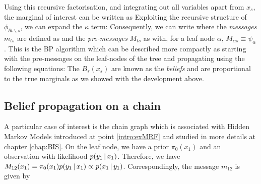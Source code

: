 Using this recursive factorisation, and integrating out all variables apart from $x_{s}$, the marginal of interest can be written as
Exploiting the recursive structure of $\phi_{\partial t\backslash s}$, we can expand the $\kappa$ term:
Consequently, we can write
where the \emph{messages} $m_{ts}$ are defined as
and the \emph{pre-messages} $M_{ts}$ as
with, for a leaf node $\alpha$, $M_{\alpha  s} \equiv \psi_\alpha$. This is the BP algorithm which can be described more compactly as starting with the pre-messages on the leaf-nodes of the tree and propagating using the following equations:
The $B_{s}(x_{s})$ are known as the \emph{beliefs} and are proportional to the true marginals as we showed with the development above.

\subsection{Belief propagation on a chain}
A particular case of interest is the chain graph which is associated with Hidden Markov Models introduced at point \ref{intro:exMRF} and studied in more details at chapter \ref{chap:BIS}. On the leaf node, we have a prior $\pi_{0}(x_{1})$ and an observation with likelihood $p(y_{1}\,|\, x_{1})$. Therefore, we have $M_{12}(x_{1})=\pi_{0}(x_{1})p(y_{1}\,|\, x_{1})\propto p(x_{1}\,|\, y_{1})$. Correspondingly, the message $m_{12}$ is given by
